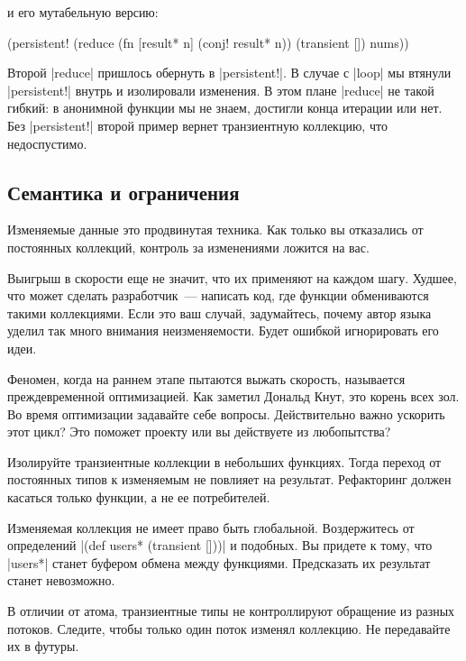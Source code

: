 \noindent
и его мутабельную версию:

\begin{english}
  \begin{clojure}
(persistent!
 (reduce
  (fn [result* n]
    (conj! result* n))
  (transient [])
  nums))
  \end{clojure}
\end{english}

Второй \spverb|reduce| пришлось обернуть в \spverb|persistent!|. В случае с
\spverb|loop| мы втянули \spverb|persistent!| внутрь и изолировали изменения. В
этом плане \spverb|reduce| не такой гибкий: в анонимной функции мы не знаем,
достигли конца итерации или нет. Без \spverb|persistent!| второй пример вернет
транзиентную коллекцию, что недоспустимо.

\subsection{Семантика и ограничения}

Изменяемые данные это продвинутая техника. Как только вы отказались от
постоянных коллекций, контроль за изменениями ложится на вас.

Выигрыш в скорости еще не значит, что их применяют на каждом шагу. Худшее, что
может сделать разработчик~--- написать код, где функции обмениваются такими
коллекциями. Если это ваш случай, задумайтесь, почему автор языка уделил так
много внимания неизменяемости. Будет ошибкой игнорировать его идеи.

Феномен, когда на раннем этапе пытаются выжать скорость, называется
преждевременной оптимизацией. Как заметил Дональд Кнут, это корень всех зол. Во
время оптимизации задавайте себе вопросы. Действительно важно ускорить этот
цикл? Это поможет проекту или вы действуете из любопытства?

Изолируйте транзиентные коллекции в небольших функциях. Тогда переход от
постоянных типов к изменяемым не повлияет на результат. Рефакторинг должен
касаться только функции, а не ее потребителей.

Изменяемая коллекция не имеет право быть глобальной. Воздержитесь от определений
\spverb|(def users* (transient []))| и подобных. Вы придете к тому, что
\spverb|users*| станет буфером обмена между функциями. Предсказать их результат
станет невозможно.

В отличии от атома, транзиентные типы не контроллируют обращение из разных
потоков. Следите, чтобы только один поток изменял коллекцию. Не передавайте их в
футуры.

